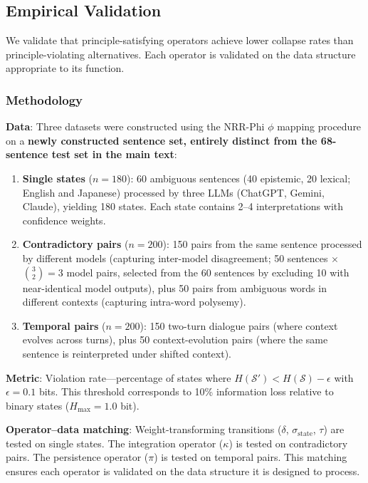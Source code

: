 \documentclass[11pt,a4paper]{article}
\begin{document}
\subsection{Empirical Validation}
\label{app:validation}

We validate that principle-satisfying operators achieve lower collapse 
rates than principle-violating alternatives. Each operator is validated 
on the data structure appropriate to its function.

\subsubsection{Methodology}

\textbf{Data}: Three datasets were constructed using the NRR-Phi 
$\phi$ mapping procedure on a \textbf{newly constructed sentence set, 
entirely distinct from the 68-sentence test set in the main text}:

\begin{enumerate}
    \item \textbf{Single states} ($n = 180$): 60 ambiguous sentences 
          (40 epistemic, 20 lexical; English and Japanese) processed 
          by three LLMs (ChatGPT, Gemini, Claude), yielding 180 states. 
          Each state contains 2--4 interpretations with confidence weights.
    
    \item \textbf{Contradictory pairs} ($n = 200$): 150 pairs from the 
          same sentence processed by different models (capturing 
          inter-model disagreement; 50 sentences $\times$ $\binom{3}{2} = 3$ 
          model pairs, selected from the 60 sentences by excluding 
          10 with near-identical model outputs), plus 50 pairs from 
          ambiguous words in different contexts (capturing intra-word 
          polysemy).
    
    \item \textbf{Temporal pairs} ($n = 200$): 150 two-turn dialogue 
          pairs (where context evolves across turns), plus 50 
          context-evolution pairs (where the same sentence is 
          reinterpreted under shifted context).
\end{enumerate}

\textbf{Metric}: Violation rate---percentage of states where 
$H(\mathcal{S}') < H(\mathcal{S}) - \epsilon$ with $\epsilon = 0.1$ bits. 
This threshold corresponds to 10\% information loss relative to binary states 
($H_{\max} = 1.0$ bit).

\textbf{Operator--data matching}: Weight-transforming transitions 
($\delta$, $\sigma_{\mathrm{state}}$, $\tau$) are tested on single states. The integration 
operator ($\kappa$) is tested on contradictory pairs. The persistence 
operator ($\pi$) is tested on temporal pairs. This matching ensures each 
operator is validated on the data structure it is designed to process.
\end{document}
